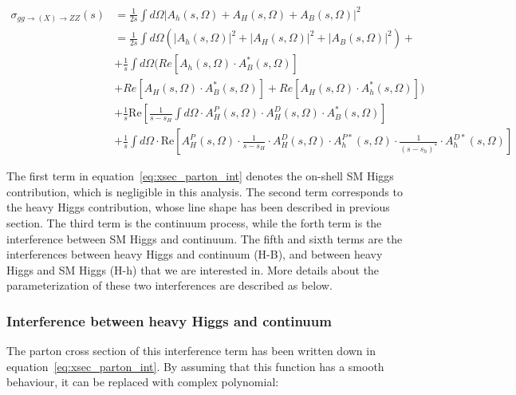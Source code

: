 \begingroup
\small
\begin{equation} \label{eq:xsec_parton_int}
\begin{split}
    \sigma_{gg \to (X) \to ZZ} (s) &= \frac{1}{2s}  \int d \Omega \left | A_h(s,\Omega) + A_H(s,\Omega) + A_B(s,\Omega) \right |^2 \\
    &= \frac{1}{2s}  \int d \Omega  \left (  \left | A_h(s,\Omega)  \right |^2 +  \left | A_H(s,\Omega)  \right |^2 +  \left | A_B(s,\Omega)  \right |^2  \right )  + \\
    &+ \frac{1}{s}  \int d \Omega  \big( Re \left [ A_h(s,\Omega) \cdot A^*_B(s,\Omega)  \right ] \\
    &+ Re \left [ A_H(s,\Omega) \cdot A^*_B(s,\Omega)  \right ] + Re \left [ A_H(s,\Omega) \cdot A^*_h(s,\Omega)  \right ]  \big) \\
    &+ \frac{1}{s} \mathrm{Re} \left [ \frac{1}{s-s_H}  \int d \Omega \cdot A_H^P(s,\Omega)  \cdot A_H^D(s,\Omega) \cdot A^*_B(s,\Omega)  \right ] \\
    &+ \frac{1}{s} \int d \Omega \cdot \mathrm{Re} \left [A_H^P(s,\Omega)\cdot  \frac{1}{s-s_H}   \cdot A_H^D(s,\Omega) \cdot A_h^{P*}(s,\Omega)\cdot  \frac{1}{(s-s_h)^*}   \cdot A_h^{D*}(s,\Omega)   \right ]
\end{split}
\end{equation}
\endgroup

The first term in equation~\ref{eq:xsec_parton_int} denotes the on-shell SM Higgs contribution, which is negligible in this analysis.
The second term corresponds to the heavy Higgs contribution, whose line shape has been described in previous section.
The third term is the \ggZZ continuum process, while the forth term is the interference between SM Higgs and \ggZZ continuum.
The fifth and sixth terms are the interferences between heavy Higgs and \ggZZ continuum (H-B), and between heavy Higgs and SM Higgs (H-h) that we are interested in.
More details about the parameterization of these two interferences are described as below.

\subsubsection{Interference between heavy Higgs and \ggZZ continuum}

The parton cross section of this interference term has been written down in equation~\ref{eq:xsec_parton_int}.
By assuming that this function has a smooth behaviour, it can be replaced with complex polynomial:

